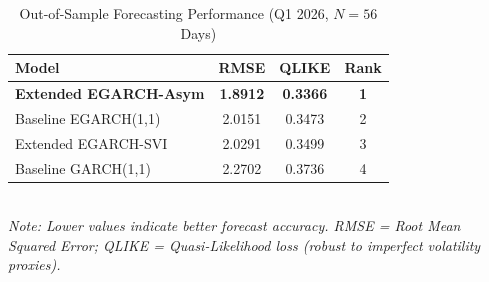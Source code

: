 \begin{table}[H]
\centering
\caption{Out-of-Sample Forecasting Performance (Q1 2026, $N = 56$ Days)}
\label{tab:oos}
\small
\begin{tabular}{lccc}
\toprule
Model & RMSE & QLIKE & Rank \\
\midrule
        \textbf{Extended EGARCH-Asym} & \textbf{1.8912} & \textbf{0.3366} & \textbf{1} \\
        Baseline EGARCH(1,1) & 2.0151 & 0.3473 & 2 \\
        Extended EGARCH-SVI & 2.0291 & 0.3499 & 3 \\
        Baseline GARCH(1,1) & 2.2702 & 0.3736 & 4 \\
\bottomrule
\end{tabular}
\smallskip\\
\footnotesize\textit{Note: Lower values indicate better forecast accuracy. RMSE = Root Mean Squared Error; QLIKE = Quasi-Likelihood loss (robust to imperfect volatility proxies).}
\end{table}